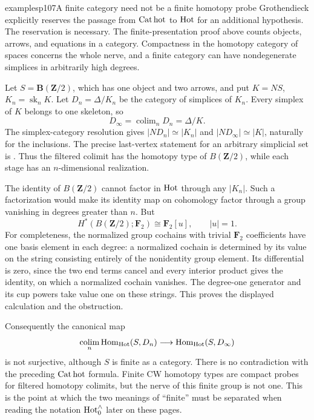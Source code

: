 \begin{dcomment}{examples}{p107}{A finite category need not be a finite homotopy probe}
Grothendieck explicitly reserves the passage from $\mathrm{Cat\,hot}$ to $\mathrm{Hot}$ for an additional hypothesis. The reservation is necessary. The finite-presentation proof above counts objects, arrows, and equations in a category. Compactness in the homotopy category of spaces concerns the whole nerve, and a finite category can have nondegenerate simplices in arbitrarily high degrees.

Let $S=\mathbf B(\mathbf Z/2)$, which has one object and two arrows, and put $K=NS$, $K_n=\operatorname{sk}_n K$. Let $D_n=\Delta/K_n$ be the category of simplices of $K_n$. Every simplex of $K$ belongs to one skeleton, so
\[
 D_\infty=\mathop{\mathrm{colim}}_nD_n=\Delta/K.
\]
The simplex-category resolution gives $|ND_n|\simeq|K_n|$ and $|ND_\infty|\simeq|K|$, naturally for the inclusions. The precise last-vertex statement for an arbitrary simplicial set is \citet[Corollary~11.9.11.5]{Kerodon2026Simplex}. Thus the filtered colimit has the homotopy type of $B(\mathbf Z/2)$, while each stage has an $n$-dimensional realization.

The identity of $B(\mathbf Z/2)$ cannot factor in $\mathrm{Hot}$ through any $|K_n|$. Such a factorization would make its identity map on cohomology factor through a group vanishing in degrees greater than $n$. But
\[
 H^*(B(\mathbf Z/2);\mathbf F_2)\cong\mathbf F_2[u],\qquad |u|=1.
\]
For completeness, the normalized group cochains with trivial $\mathbf F_2$ coefficients have one basis element in each degree: a normalized cochain is determined by its value on the string consisting entirely of the nonidentity group element. Its differential is zero, since the two end terms cancel and every interior product gives the identity, on which a normalized cochain vanishes. The degree-one generator and its cup powers take value one on these strings. This proves the displayed calculation and the obstruction.

Consequently the canonical map
\[
 \mathop{\mathrm{colim}}_n\mathrm{Hom}_{\mathrm{Hot}}(S,D_n)
 \longrightarrow\mathrm{Hom}_{\mathrm{Hot}}(S,D_\infty)
\]
is not surjective, although $S$ is finite as a category. There is no contradiction with the preceding $\mathrm{Cat\,hot}$ formula. Finite CW homotopy types are compact probes for filtered homotopy colimits, but the nerve of this finite group is not one. This is the point at which the two meanings of ``finite'' must be separated when reading the notation $\mathrm{Hot}^{\wedge}_{0}$ later on these pages.
\end{dcomment}


